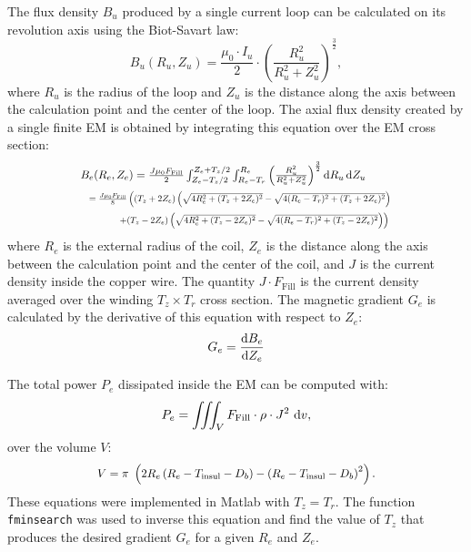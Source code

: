 The flux density $B_u$ produced by a single current loop can be calculated on its revolution axis using the Biot-Savart law:
%
\begin{equation}
B_{u}(R_u,Z_u)={\frac{\mu _0\cdot I_{u}}{2}}\cdot\left ( {\frac{R_{u}^2}{R_{u}^2+Z_u^2}} \right )^{\frac{3}{2}},
\label{bloop}
\end{equation}
%
where $R_u$ is the radius of the loop and $Z_u$ is the distance along the axis between the calculation point and the center of the loop.
The axial flux density created by a single finite EM is obtained by integrating this equation over the EM cross section:
%
\begin{align}
&\scalebox{.88}{$
B_e(R_e,Z_e) =
{\frac{J \mu _0   F_{\textrm{Fill}} }{2}} \int_{Z_e-T_z/2}^{Z_e+T_z/2} \int_{R_e-T_r}^{R_e} \left ( {\frac{R_{u}^2}{R_{u}^2+Z_u^2}} \right )^{\frac{3}{2}} \d R_u  \d Z_u 
$} \\
 &~~\scalebox{.7}{$=
  \frac{J \mu _0   F_{\textrm{Fill}}}{8}\left((T_z+2 Z_e) \left(\sqrt{4 R_e^2+(T_z+2 Z_e)^2}-\sqrt{4 (R_e-T_r)^2+(T_z+2 Z_e)^2}\right) \right. 
  $}  \nonumber \\
  & \qquad ~~~ \scalebox{.7}{$\left.+(T_z-2 Z_e) \left(\sqrt{4 R_e^2+(T_z-2 Z_e)^2}-\sqrt{4 (R_e-T_r)^2+(T_z-2 Z_e)^2}\right)\right)$} \nonumber
\label{Be}
\end{align}
%
where $R_e$ is the external radius of the coil, $Z_e$ is the distance along the axis between the calculation point and the center of the coil, and $J$ is the current density inside the copper wire.
 The quantity $J\cdot F_{\textrm{Fill}} $ is the current density averaged over the winding $T_z \times T_r$ cross section.
  The magnetic gradient $G_e$ is calculated by the derivative of this equation with respect to $Z_e$:
\begin{equation}
G_e=\frac{\operatorname{d}\!{B}_e}{\operatorname{d}\!{Z}_e}
\label{Ge}
\end{equation}

The total power $P_e$ dissipated inside the EM can be computed with:
%
\begin{equation}
P_e=\iiint_V F_{\textrm{Fill}}  \cdot \rho\cdot J^2 \,\operatorname{d}\!{v}, 
\label{Pe}
\end{equation}
%
over the volume $V$:
\begin{equation}
\scalebox{.9}{$V=\pi\ \left ( 2R_e \left ( R_e- T_{\textrm{insul}} -D_b \right ) -\left ( R_e-T_{\textrm{insul}}-D_b \right )^2\right ).$}
\label{V70cm}
\end{equation}
%
These equations were implemented in {\sc Matlab} with $T_z = T_r$. The function \texttt{fminsearch} was used to inverse this equation and find the value of $T_z$ that produces the desired gradient $G_e$ for a given $R_e$ and $Z_e$.

